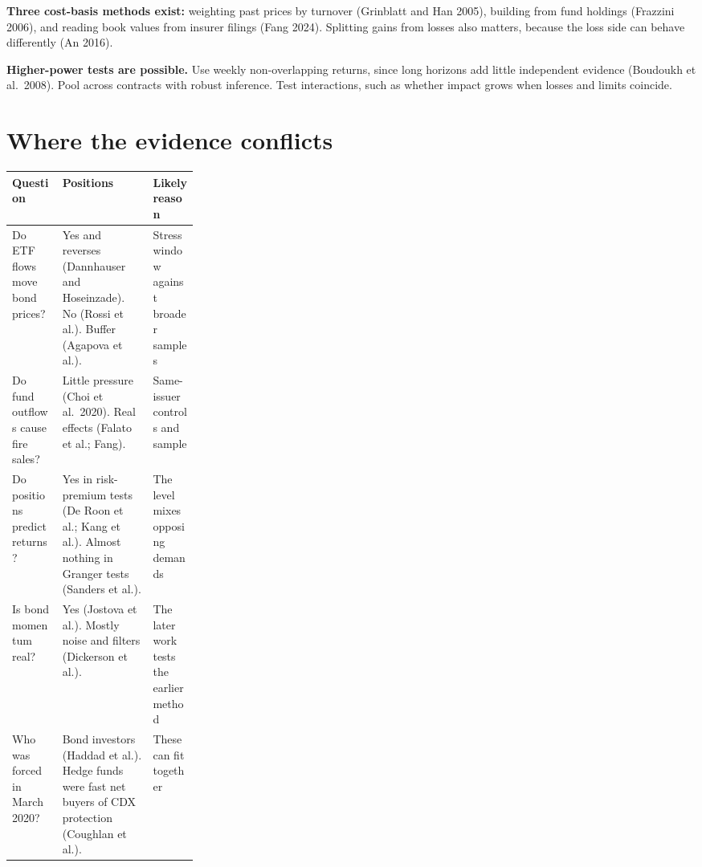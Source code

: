 \documentclass[11pt]{article}
\begin{document}
\textbf{Three cost-basis methods exist:} weighting past prices by turnover (Grinblatt and Han 2005), building from fund holdings (Frazzini 2006), and reading book values from insurer filings (Fang 2024). Splitting gains from losses also matters, because the loss side can behave differently (An 2016).

\textbf{Higher-power tests are possible.} Use weekly non-overlapping returns, since long horizons add little independent evidence (Boudoukh et al.\ 2008). Pool across contracts with robust inference. Test interactions, such as whether impact grows when losses and limits coincide.

\section{Where the evidence conflicts}
\small
\begin{tabularx}{\linewidth}{@{}p{0.27\linewidth}LL@{}}
\toprule
Question & Positions & Likely reason \\
\midrule
Do ETF flows move bond prices? & Yes and reverses (Dannhauser and Hoseinzade). No (Rossi et al.). Buffer (Agapova et al.). & Stress window against broader samples \\
Do fund outflows cause fire sales? & Little pressure (Choi et al.\ 2020). Real effects (Falato et al.; Fang). & Same-issuer controls and sample \\
Do positions predict returns? & Yes in risk-premium tests (De Roon et al.; Kang et al.). Almost nothing in Granger tests (Sanders et al.). & The level mixes opposing demands \\
Is bond momentum real? & Yes (Jostova et al.). Mostly noise and filters (Dickerson et al.). & The later work tests the earlier method \\
Who was forced in March 2020? & Bond investors (Haddad et al.). Hedge funds were fast net buyers of CDX protection (Coughlan et al.). & These can fit together \\
\bottomrule
\end{tabularx}
\normalsize
\end{document}
